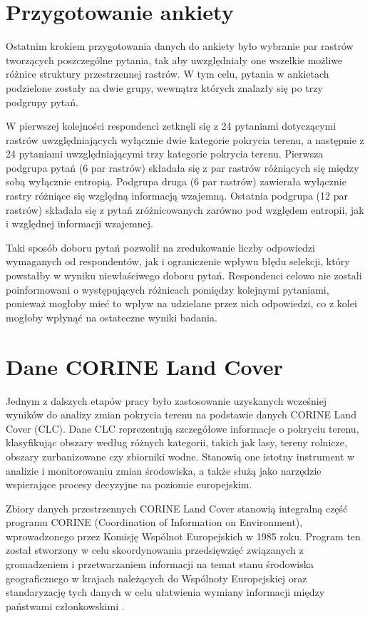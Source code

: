 \documentclass{amuthesis}
\begin{document}
\hypertarget{sec-przygotowanie1}{%
\section{Przygotowanie ankiety}\label{sec-przygotowanie1}}

Ostatnim krokiem przygotowania danych do ankiety było wybranie par
rastrów tworzących poszczególne pytania, tak aby uwzględniały one
wszelkie możliwe różnice struktury przestrzennej rastrów. W tym celu,
pytania w ankietach podzielone zostały na dwie grupy, wewnątrz których
znalazły się po trzy podgrupy pytań.

W pierwszej kolejności respondenci zetknęli się z 24 pytaniami
dotyczącymi rastrów uwzględniających wyłącznie dwie kategorie pokrycia
terenu, a następnie z 24 pytaniami uwzględniającymi trzy kategorie
pokrycia terenu. Pierwsza podgrupa pytań (6 par rastrów) składała się z
par rastrów różniących się między sobą wyłącznie entropią. Podgrupa
druga (6 par rastrów) zawierała wyłącznie rastry różniące się względną
informacją wzajemną. Ostatnia podgrupa (12 par rastrów) składała się z
pytań zróżnicowanych zarówno pod względem entropii, jak i względnej
informacji wzajemnej.

Taki sposób doboru pytań pozwolił na zredukowanie liczby odpowiedzi
wymaganych od respondentów, jak i ograniczenie wpływu błędu selekcji,
który powstałby w wyniku niewłaściwego doboru pytań. Respondenci celowo
nie zostali poinformowani o występujących różnicach pomiędzy kolejnymi
pytaniami, ponieważ mogłoby mieć to wpływ na udzielane przez nich
odpowiedzi, co z kolei mogłoby wpłynąć na ostateczne wyniki badania.

\hypertarget{sec-CLC}{%
\section{Dane CORINE Land Cover}\label{sec-CLC}}

Jednym z dalszych etapów pracy było zastosowanie uzyskanych wcześniej
wyników do analizy zmian pokrycia terenu na podstawie danych CORINE Land
Cover (CLC). Dane CLC reprezentują szczegółowe informacje o pokryciu
terenu, klasyfikując obszary według różnych kategorii, takich jak lasy,
tereny rolnicze, obszary zurbanizowane czy zbiorniki wodne. Stanowią one
istotny instrument w analizie i monitorowaniu zmian środowiska, a także
służą jako narzędzie wspierające procesy decyzyjne na poziomie
europejskim.

Zbiory danych przestrzennych CORINE Land Cover stanowią integralną część
programu CORINE (Coordination of Information on Environment),
wprowadzonego przez Komisję Wspólnot Europejskich w 1985 roku. Program
ten został stworzony w celu skoordynowania przedsięwzięć związanych z
gromadzeniem i przetwarzaniem informacji na temat stanu środowiska
geograficznego w krajach należących do Wspólnoty Europejskiej oraz
standaryzację tych danych w celu ułatwienia wymiany informacji między
państwami członkowskimi \autocite{Bielecka_Ciolkosz_2004}.
\end{document}
